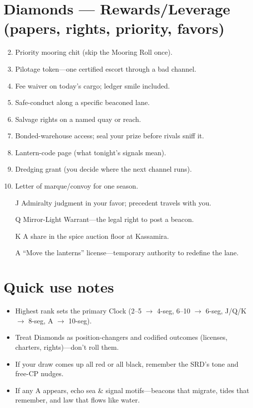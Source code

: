 \section*{Diamonds --- Rewards/Leverage (papers, rights, priority, favors)}
\label{sec:kahfagia-rewards}
\begin{enumerate}
\setcounter{enumi}{1}
\item Priority mooring chit (skip the Mooring Roll once).
\item Pilotage token---one certified escort through a bad channel.
\item Fee waiver on today's cargo; ledger smile included.
\item Safe-conduct along a specific beaconed lane.
\item Salvage rights on a named quay or reach.
\item Bonded-warehouse access; seal your prize before rivals sniff it.
\item Lantern-code page (what tonight's signals mean).
\item Dredging grant (you decide where the next channel runs).
\item Letter of marque/convoy for one season.
\item[J] Admiralty judgment in your favor; precedent travels with you.
\item[Q] Mirror-Light Warrant---the legal right to post a beacon.
\item[K] A share in the spice auction floor at Kassamira.
\item[A] ``Move the lanterns'' license---temporary authority to redefine the lane.
\end{enumerate}

\section*{Quick use notes}
\label{sec:kahfagia-quick-use}
\begin{itemize}
\item Highest rank sets the primary Clock (2--5 $\rightarrow$ 4-seg, 6--10 $\rightarrow$ 6-seg, J/Q/K $\rightarrow$ 8-seg, A $\rightarrow$ 10-seg).
\item Treat Diamonds as position-changers and codified outcomes (licenses, charters, rights)---don't roll them.
\item If your draw comes up all red or all black, remember the SRD's tone and free-CP nudges.
\item If any A appears, echo sea \& signal motifs---beacons that migrate, tides that remember, and law that flows like water.
\end{itemize}

